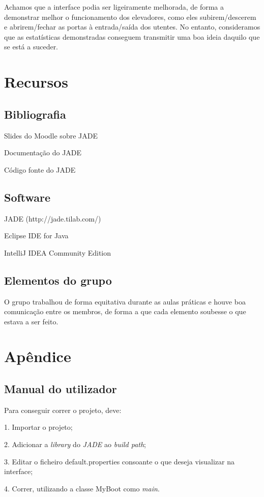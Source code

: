 \documentclass[a4paper]{article}
\begin{document}
Achamos que a interface podia ser ligeiramente melhorada, de forma a demonstrar melhor o funcionamento dos elevadores, como eles subirem/descerem e abrirem/fechar as portas à entrada/saída dos utentes. No entanto, consideramos que as estatísticas demonstradas conseguem transmitir uma boa ideia daquilo que se está a suceder.

\newpage


\section{Recursos}

\subsection{Bibliografia} 

Slides do Moodle sobre JADE

Documentação do JADE

Código fonte do JADE

\subsection{Software} 

JADE (http://jade.tilab.com/)

Eclipse IDE for Java

IntelliJ IDEA Community Edition

\subsection{Elementos do grupo}

O grupo trabalhou de forma equitativa durante as aulas práticas e houve boa comunicação entre os membros, de forma a que cada elemento soubesse o que estava a ser feito.

\section{Apêndice}

\subsection{Manual do utilizador} 

Para conseguir correr o projeto, deve:

1. Importar o projeto;

2. Adicionar a \textit{library} do \textit{JADE} ao \textit{build path};

3. Editar o ficheiro default.properties consoante o que deseja visualizar na interface;

4. Correr, utilizando a classe MyBoot como \textit{main}.

\newpage

\end{document}
